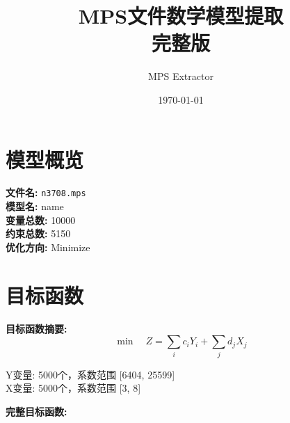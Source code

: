 \documentclass[a4paper,10pt]{article}
\title{MPS文件数学模型提取\\{\large 完整版}}
\author{MPS Extractor}
\date{\today}
\begin{document}
\maketitle
\tableofcontents
\newpage

\section{模型概览}

\textbf{文件名:} \texttt{n3708.mps} \\
\textbf{模型名:} name \\
\textbf{变量总数:} 10000 \\
\textbf{约束总数:} 5150 \\
\textbf{优化方向:} Minimize \\

\section{目标函数}

\textbf{目标函数摘要:}
\begin{equation}
\min \quad Z = \sum_{i} c_i Y_i + \sum_{j} d_j X_j
\end{equation}

Y变量: 5000个，系数范围 [6404, 25599] \\
X变量: 5000个，系数范围 [3, 8]

\textbf{完整目标函数:}
\end{document}
